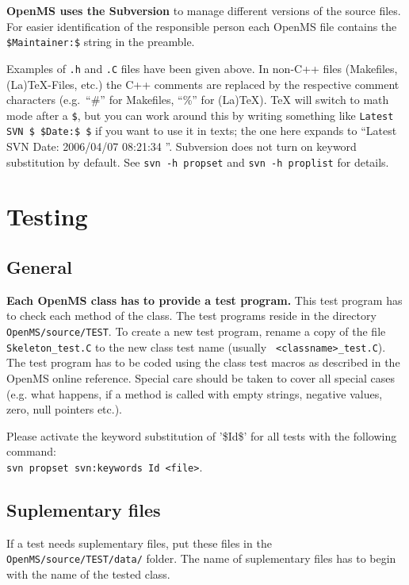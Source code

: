 \documentclass[a4]{article}
\begin{document}
\textbf{OpenMS uses the Subversion} to manage different
versions of the source files. For easier identification of the responsible person
each OpenMS file contains the \texttt{\$Maintainer{}:\$} string in the
preamble.

Examples of \texttt{.h} and \texttt{.C} files have been given above.  In
non-C++ files (Makefiles, (La)TeX-Files, etc.) the C++ comments are replaced
by the respective comment characters (e.g.\ ``\#'' for Makefiles, ``\%'' for
(La)TeX).  TeX will switch to math mode after a \texttt{\$}, but you can work
around this by writing something like
\mbox{\texttt{Latest SVN \$ \$Date{}:\$ \$}}
if you want to use it in texts; the one here expands to ``Latest SVN $ $Date:
2006/04/07 08:21:34 $ $''.  Subversion does not turn on keyword substitution
by default.  See \texttt{svn -h propset} and \texttt{svn -h proplist} for
details.



\section{Testing} 

\subsection{General}

{\bf Each OpenMS class has to provide a test program.} This test program has to check
each method of the class. The test programs reside in the directory
{\tt OpenMS/source/TEST}. To create a new test program, rename a copy of the file
{\tt Skeleton\_test.C} to the new class test name (usually {\tt
<classname>\_test.C}). The test program has to be coded using the class test
macros as described in the OpenMS online reference. Special care should be taken
to cover all special cases (e.g. what happens, if a method is called with
empty strings, negative values, zero, null pointers etc.).

Please activate the keyword substitution of '\$Id\$' for all tests with the following command:\\
{\tt svn propset svn:keywords Id <file>}.

\subsection{Suplementary files}
If a test needs suplementary files, put these files in the {\tt OpenMS/source/TEST/data/} folder.
The name of suplementary files has to begin with the name of the tested class.
\end{document}
